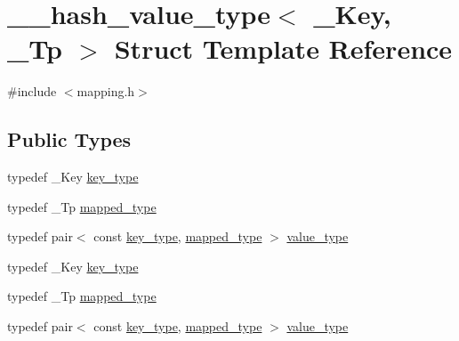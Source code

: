 \hypertarget{struct____hash__value__type}{}\section{\+\_\+\+\_\+hash\+\_\+value\+\_\+type$<$ \+\_\+\+Key, \+\_\+\+Tp $>$ Struct Template Reference}
\label{struct____hash__value__type}


{\ttfamily \#include $<$mapping.\+h$>$}

\subsection*{Public Types}
\begin{DoxyCompactItemize}
\item 
typedef \+\_\+\+Key \hyperlink{struct____hash__value__type_ac12affb5081f6691312a6826ffaf6c39}{key\+\_\+type}
\item 
typedef \+\_\+\+Tp \hyperlink{struct____hash__value__type_a8e898527f944f8e069527adfd8cd838d}{mapped\+\_\+type}
\item 
typedef pair$<$ const \hyperlink{struct____hash__value__type_ac12affb5081f6691312a6826ffaf6c39}{key\+\_\+type}, \hyperlink{struct____hash__value__type_a8e898527f944f8e069527adfd8cd838d}{mapped\+\_\+type} $>$ \hyperlink{struct____hash__value__type_ac11e71883806eb3d03807b7f284b4a70}{value\+\_\+type}
\item 
typedef \+\_\+\+Key \hyperlink{struct____hash__value__type_ac12affb5081f6691312a6826ffaf6c39}{key\+\_\+type}
\item 
typedef \+\_\+\+Tp \hyperlink{struct____hash__value__type_a8e898527f944f8e069527adfd8cd838d}{mapped\+\_\+type}
\item 
typedef pair$<$ const \hyperlink{struct____hash__value__type_ac12affb5081f6691312a6826ffaf6c39}{key\+\_\+type}, \hyperlink{struct____hash__value__type_a8e898527f944f8e069527adfd8cd838d}{mapped\+\_\+type} $>$ \hyperlink{struct____hash__value__type_ac11e71883806eb3d03807b7f284b4a70}{value\+\_\+type}
\end{DoxyCompactItemize}
